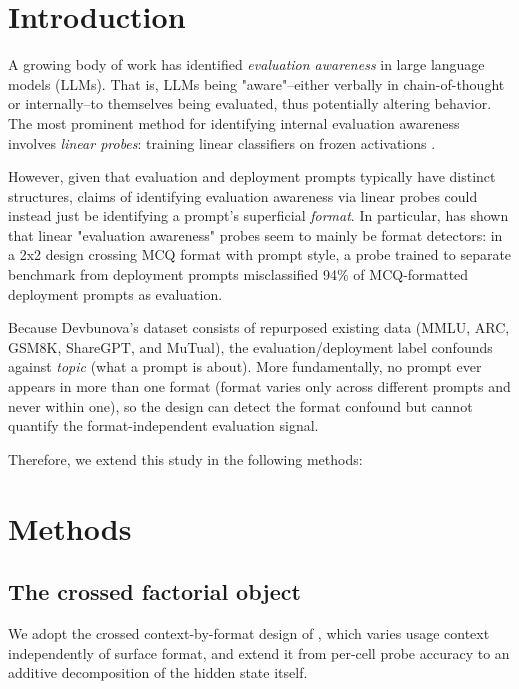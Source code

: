 \section{Introduction}
A growing body of work has identified \textit{evaluation awareness} in large language models (LLMs). That is, LLMs being "aware"--either verbally in chain-of-thought or internally--to themselves being evaluated, thus potentially altering behavior. The most prominent method for identifying internal evaluation awareness involves \textit{linear probes}: training linear classifiers on frozen activations \citep{nguyen2025probing, chaudhary2025evaluation}.

However, given that evaluation and deployment prompts typically have distinct structures, claims of identifying evaluation awareness via linear probes could instead just be identifying a prompt's superficial \textit{format}. In particular, \cite{devbunova2026format} has shown that linear "evaluation awareness" probes seem to mainly be format detectors: in a 2x2 design crossing MCQ format with prompt style, a probe trained to separate benchmark from deployment prompts misclassified 94\% of MCQ-formatted deployment prompts as evaluation.

Because Devbunova's dataset consists of repurposed existing data (MMLU, ARC, GSM8K, ShareGPT, and MuTual), the evaluation/deployment label confounds against \textit{topic} (what a prompt is about). More fundamentally, no prompt ever appears in more than one format (format varies only across different prompts and never within one), so the design can detect the format confound but cannot quantify the format-independent evaluation signal.

Therefore, we extend this study in the following methods:


\section{Methods}

\subsection{The crossed factorial object}

We adopt the crossed context-by-format design of \citet{devbunova2026format},
which varies usage context independently of surface format, and extend it
from per-cell probe accuracy to an additive decomposition of the hidden
state itself.

